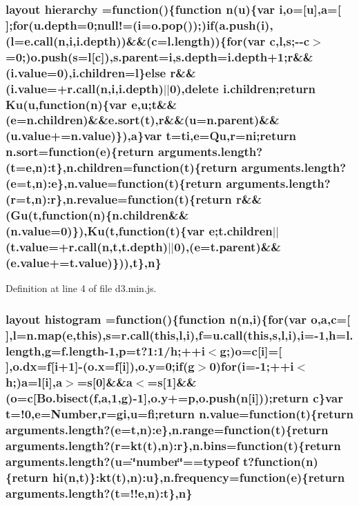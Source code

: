 \subsubsection[{hierarchy}]{ {\bf layout} hierarchy =function()\{function {\bf n}(u)\{var {\bf i},{\bf o}=[u],{\bf a}=[$\,$];{\bf for}(u.\+depth=0;null!=({\bf i}=o.\+pop());){\bf if}(a.\+push({\bf i}),(l={\bf e.\+call}({\bf n},{\bf i},i.\+depth))\&\&({\bf c}=l.\+length))\{{\bf for}(var {\bf c},l,s;-\/-\/{\bf c}$>$=0;)o.\+push(s=l[{\bf c}]),s.\+parent={\bf i},s.\+depth=i.\+depth+1;{\bf r}\&\&(i.\+value=0),i.\+children=l\}{\bf else} {\bf r}\&\&(i.\+value=+{\bf r.\+call}({\bf n},{\bf i},i.\+depth)$\vert$$\vert$0),delete i.\+children;{\bf return} {\bf Ku}(u,function({\bf n})\{var {\bf e},u;t\&\&({\bf e}=n.\+children)\&\&{\bf e.\+sort}(t),{\bf r}\&\&(u=n.\+parent)\&\&(u.\+value+=n.\+value)\}),{\bf a}\}var t={\bf ti},{\bf e}={\bf Qu},{\bf r}={\bf ni};{\bf return} {\bf n.\+sort}=function({\bf e})\{{\bf return} arguments.\+length?(t={\bf e},{\bf n})\+:t\},n.\+children=function(t)\{{\bf return} arguments.\+length?({\bf e}=t,{\bf n})\+:{\bf e}\},n.\+value=function(t)\{{\bf return} arguments.\+length?({\bf r}=t,{\bf n})\+:{\bf r}\},n.\+revalue=function(t)\{{\bf return} {\bf r}\&\&({\bf Gu}(t,function({\bf n})\{n.\+children\&\&(n.\+value=0)\}),{\bf Ku}(t,function(t)\{var {\bf e};t.\+children$\vert$$\vert$(t.\+value=+{\bf r.\+call}({\bf n},t,t.\+depth)$\vert$$\vert$0),({\bf e}=t.\+parent)\&\&(e.\+value+=t.\+value)\})),t\},{\bf n}\}}\label{d3_8min_8js_abb26e9546d31222851beb4996db31ded}


Definition at line 4 of file d3.\+min.\+js.

\subsubsection[{histogram}]{ {\bf layout} histogram =function()\{function {\bf n}({\bf n},{\bf i})\{{\bf for}(var {\bf o},{\bf a},{\bf c}=[$\,$],l={\bf n.\+map}({\bf e},{\bf this}),s={\bf r.\+call}({\bf this},l,{\bf i}),{\bf f}={\bf u.\+call}({\bf this},s,l,{\bf i}),{\bf i}=-\/1,h=l.\+length,g=f.\+length-\/1,p=t?1\+:1/h;++{\bf i}$<$g;){\bf o}={\bf c}[{\bf i}]=[$\,$],o.\+dx={\bf f}[{\bf i}+1]-\/({\bf o.\+x}={\bf f}[{\bf i}]),o.\+y=0;{\bf if}(g$>$0){\bf for}({\bf i}=-\/1;++{\bf i}$<$h;){\bf a}=l[{\bf i}],{\bf a}$>$=s[0]\&\&{\bf a}$<$=s[1]\&\&({\bf o}={\bf c}[{\bf Bo.\+bisect}({\bf f},{\bf a},1,g)-\/1],o.\+y+=p,o.\+push({\bf n}[{\bf i}]));{\bf return} {\bf c}\}var t=!0,{\bf e}=Number,{\bf r}={\bf gi},u={\bf fi};{\bf return} n.\+value=function(t)\{{\bf return} arguments.\+length?({\bf e}=t,{\bf n})\+:{\bf e}\},{\bf n.\+range}=function(t)\{{\bf return} arguments.\+length?({\bf r}=kt(t),{\bf n})\+:{\bf r}\},n.\+bins=function(t)\{{\bf return} arguments.\+length?(u=\char`\"{}number\char`\"{}==typeof t?function({\bf n})\{{\bf return} {\bf hi}({\bf n},t)\}\+:kt(t),{\bf n})\+:u\},n.\+frequency=function({\bf e})\{{\bf return} arguments.\+length?(t=!!{\bf e},{\bf n})\+:t\},{\bf n}\}}\label{d3_8min_8js_a34dcf6cece46a2053e1612ae122f3b0b}


